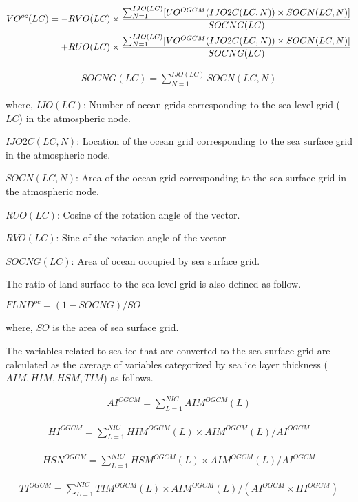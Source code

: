 \begin{eqnarray} VO^{oc}(LC)=-RVO(LC) \times  \frac{\sum_{N=1}^{IJO(LC)}[UO^{OGCM}(IJO2C(LC,N)) \times SOCN(LC,N)]}{SOCNG(LC)} \notag\\ + RUO(LC) \times  \frac{\sum_{N=1}^{IJO(LC)}[VO^{OGCM}(IJO2C(LC,N)) \times SOCN(LC,N)]}{SOCNG(LC)} \end{eqnarray}

\begin{eqnarray} SOCNG(LC)= \sum_{N=1}^{IJO(LC)}SOCN(LC,N) \end{eqnarray}

where, \(IJO(LC)\): Number of ocean grids corresponding to the sea level grid (\(LC\)) in the atmospheric node.

\(IJO2C(LC,N)\): Location of the ocean grid corresponding to the sea surface grid in the atmospheric node.

\(SOCN(LC,N)\): Area of the ocean grid corresponding to the sea surface grid in the atmospheric node.

\(RUO(LC)\): Cosine of the rotation angle of the vector.

\(RVO(LC)\): Sine of the rotation angle of the vector

\(SOCNG(LC)\): Area of ocean occupied by sea surface grid.

The ratio of land surface to the sea level grid is also defined as follow.

\(FLND^{oc}=(1-SOCNG)/SO\)

where, \(SO\) is the area of sea surface grid.

The variables related to sea ice that are converted to the sea surface grid are calculated as the average of variables categorized by sea ice layer thickness (\(AIM,HIM,HSM,TIM\)) as follows.

\begin{eqnarray} AI^{OGCM} = \sum_{L=1}^{NIC} AIM^{OGCM}(L) \end{eqnarray}

\begin{eqnarray} HI^{OGCM} = \sum_{L=1}^{NIC} HIM^{OGCM}(L) \times AIM^{OGCM}(L)/AI^{OGCM} \end{eqnarray}

\begin{eqnarray} HSN^{OGCM} = \sum_{L=1}^{NIC} HSM^{OGCM}(L) \times AIM^{OGCM}(L)/AI^{OGCM} \end{eqnarray}

\begin{eqnarray} TI^{OGCM} = \sum_{L=1}^{NIC} TIM^{OGCM}(L) \times AIM^{OGCM}(L)/(AI^{OGCM} \times HI^{OGCM}) \end{eqnarray}

